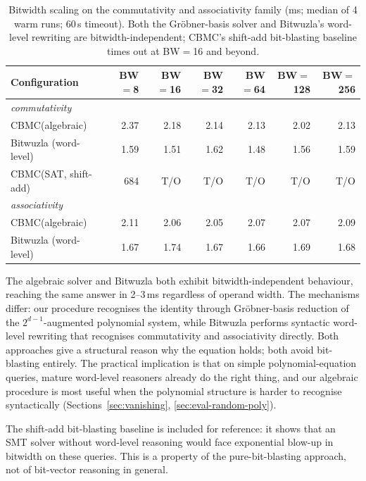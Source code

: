 \documentclass[runningheads]{llncs}
\newcommand{\cbmc}{\textsc{CBMC}\xspace}
\begin{document}
\begin{table}[ht]
\caption{Bitwidth scaling on the commutativity and associativity
  family (ms; median of 4 warm runs; 60\,s timeout). Both the
  Gr\"obner-basis solver and Bitwuzla's word-level rewriting are
  bitwidth-independent; \cbmc's shift-add bit-blasting baseline
  times out at BW$=$16 and beyond.}
\label{tab:scaling}
\centering
\begin{tabular}{lrrrrrr}
\toprule
Configuration & BW$=$8 & BW$=$16 & BW$=$32 & BW$=$64 & BW$=$128 & BW$=$256 \\
\midrule
\multicolumn{7}{l}{\emph{commutativity}} \\
\cbmc (algebraic)        & 2.37 & 2.18 & 2.14 & 2.13 & 2.02 & 2.13 \\
Bitwuzla (word-level)    & 1.59 & 1.51 & 1.62 & 1.48 & 1.56 & 1.59 \\
\cbmc (SAT, shift-add)   & 684 & T/O & T/O & T/O & T/O & T/O \\
\midrule
\multicolumn{7}{l}{\emph{associativity}} \\
\cbmc (algebraic)        & 2.11 & 2.06 & 2.05 & 2.07 & 2.07 & 2.09 \\
Bitwuzla (word-level)    & 1.67 & 1.74 & 1.67 & 1.66 & 1.69 & 1.68 \\
\bottomrule
\end{tabular}
\end{table}

The algebraic solver and Bitwuzla both exhibit bitwidth-independent
behaviour, reaching the same answer in 2--3\,ms regardless of
operand width. The mechanisms differ: our procedure recognises the
identity through Gr\"obner-basis reduction of the
$2^{d-1}$-augmented polynomial system, while Bitwuzla performs
syntactic word-level rewriting that recognises commutativity and
associativity directly. Both approaches give a structural reason
why the equation holds; both avoid bit-blasting entirely. The
practical implication is that on simple polynomial-equation
queries, mature word-level reasoners already do the right thing,
and our algebraic procedure is most useful when the polynomial
structure is harder to recognise syntactically (Sections~\ref{sec:vanishing},
\ref{sec:eval-random-poly}).

The shift-add bit-blasting baseline is included for reference: it
shows that an SMT solver without word-level reasoning would face
exponential blow-up in bitwidth on these queries. This is a
property of the pure-bit-blasting approach, not of bit-vector
reasoning in general.
\end{document}
